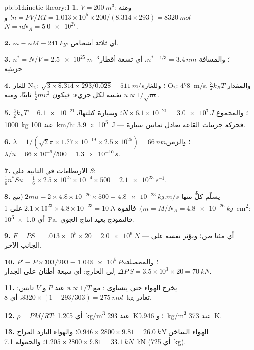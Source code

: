 \begin{solution}{pb:b1:kinetic-theory:1}
\textbf{1.} $V = \qty{200}{m^3}$: ومنه $n = PV/RT = 1.013\times10^5 \times 200/(8.314
\times 293) = \qty{8320}{mol}$؛ و $N = nN_A = \num{5.0e27}$.

\textbf{2.} $m = nM = \qty{241}{kg}$: أي ثلاثة أشخاص.

\textbf{3.} $n^* = N/V = \qty{2.5e25}{m^{-3}}$؛ والمسافة $n^{*-1/3} = \qty{3.4}{nm}$،
أي تسعة أقطار جزيئية.

\textbf{4.} للغاز N$_2$: $\sqrt{3 \times 8.314 \times 293/0.028} = \qty{511}{m/s}$؛
وللغاز O$_2$: \qty{478}{m/s}. والمقدار $\tfrac32 k_BT$ نفسه لكل جزيء: فيكون $\tfrac12 mu^2$ ثابتًا،
ومنه $u \propto 1/\sqrt m$.

\textbf{5.} $\tfrac32 k_BT = \qty{6.1e-21}{J}$؛ والمجموع $N \times 6.1\times10^{-21}
= \qty{3.0e7}{J}$؛ وسيارة كتلتها \qty{1000}{kg} عند \qty{100}{km/h}: \qty{3.9e5}{J} ---
فحركة جزيئات القاعة تعادل ثمانين سيارة.

\textbf{6.} $\lambda = 1/(\sqrt2\pi \times 1.37\times10^{-19} \times 2.5\times10^{25})
= \qty{66}{nm}$؛ والزمن $\lambda/u = 66\times10^{-9}/500 = \qty{1.3e-10}{s}$.

\textbf{7.} الارتطامات في الثانية على $S$: $\tfrac16 n^*Su = \tfrac16 \times 2.5\times
10^{25} \times 10^{-4} \times 500 = \qty{2.1e23}{s^{-1}}$.

\textbf{8.} يسلّم كلٌّ منها $2mu = 2 \times 4.8\times10^{-26} \times 500 = \qty{4.8e-23}{kg.m/s}$
(مع $m = M/N_A = \qty{4.8e-26}{kg}$): فالقوة $2.1\times10^{23} \times 4.8\times10^{-23}
= \qty{10}{N}$ على \qty{1}{cm^2}: أي \qty{1.0e5}{Pa}. فالنموذج يعيد إنتاج
 الجوي.

\textbf{9.} $F = PS = 1.013\times10^5 \times 20 = \qty{2.0e6}{N}$ --- أي مئتا
طن؛ ويؤثر  نفسه على الجانب الآخر.

\textbf{10.} $P' = P \times 303/293 = \qty{1.048e5}{Pa}$؛ والمحصلة $\Delta P\,S = 3.5
\times10^3 \times 20 = \qty{70}{kN}$ إلى الخارج: أي سبعة أطنان على الجدار.

\textbf{11.} يخرج الهواء حتى يتساوى : مع $n \propto 1/T$ عند
$P$ و $V$ ثابتين: $8320 \times (1 - 293/303) = \qty{275}{mol}$، أي \qty{8}{kg}
تغادر.

\textbf{12.} $\rho = PM/RT$: أي \qty{1.205}{kg/m^3} عند \qty{293}{K}؛ و \qty{0.946}{kg/m^3}
عند \qty{373}{K}.

\textbf{13.} الهواء الساخن $0.946 \times 2800 \times 9.81 = \qty{26.0}{kN}$؛ والهواء
البارد المزاح $1.205 \times 2800 \times 9.81 = \qty{33.1}{kN}$؛ والحمولة \qty{7.1}{kN}
(أي \qty{725}{kg}).


\end{solution}

